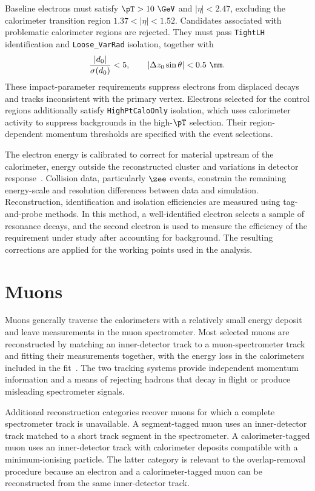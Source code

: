 Baseline electrons must satisfy $\pT>10~\GeV$ and $|\eta|<2.47$, excluding the calorimeter transition region $1.37<|\eta|<1.52$.
Candidates associated with problematic calorimeter regions are rejected.
They must pass \texttt{TightLH} identification and \texttt{Loose\_VarRad} isolation, together with
\begin{align}
    \frac{|d_0|}{\sigma(d_0)} < 5,
    \qquad
    |\Delta z_0\sin\theta| < 0.5~\mm.
    \label{eq:ch6_electron_ip}
\end{align}
These impact-parameter requirements suppress electrons from displaced decays and tracks inconsistent with the primary vertex.
Electrons selected for the control regions additionally satisfy \texttt{HighPtCaloOnly} isolation, which uses calorimeter activity to suppress backgrounds in the high-$\pT$ selection.
Their region-dependent momentum thresholds are specified with the event selections.

The electron energy is calibrated to correct for material upstream of the calorimeter, energy outside the reconstructed cluster and variations in detector response~\cite{ATLAS2019ElectronPerformance}.
Collision data, particularly $\zee$ events, constrain the remaining energy-scale and resolution differences between data and simulation.
Reconstruction, identification and isolation efficiencies are measured using tag-and-probe methods.
In this method, a well-identified electron selects a sample of resonance decays, and the second electron is used to measure the efficiency of the requirement under study after accounting for background.
The resulting corrections are applied for the working points used in the analysis.

\section{Muons}
\label{sec:ch6_muons}

Muons generally traverse the calorimeters with a relatively small energy deposit and leave measurements in the muon spectrometer.
Most selected muons are reconstructed by matching an inner-detector track to a muon-spectrometer track and fitting their measurements together, with the energy loss in the calorimeters included in the fit~\cite{ATLAS2021MuonID}.
The two tracking systems provide independent momentum information and a means of rejecting hadrons that decay in flight or produce misleading spectrometer signals.

Additional reconstruction categories recover muons for which a complete spectrometer track is unavailable.
A segment-tagged muon uses an inner-detector track matched to a short track segment in the spectrometer.
A calorimeter-tagged muon uses an inner-detector track with calorimeter deposits compatible with a minimum-ionising particle.
The latter category is relevant to the overlap-removal procedure because an electron and a calorimeter-tagged muon can be reconstructed from the same inner-detector track.

